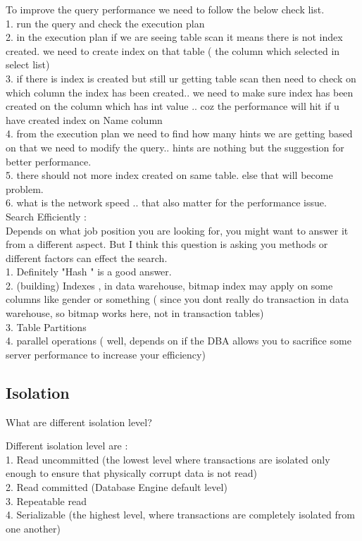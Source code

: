 To improve the query performance we need to follow the below check list. \\
1. run the query and check the execution plan \\
2. in the execution plan if we are seeing table scan it means there is not index created. we need to create index on that table ( the column which selected in select list) \\
3. if there is index is created but still ur getting table scan then need to check on which column the index has been created.. we need to make sure index has been created on the 
column which has int value .. coz the performance will hit if u have created index on Name column \\
4. from the execution plan we need to find how many hints we are getting based on that we need to modify the query.. hints are nothing but the suggestion for better performance. \\
5. there should not more index created on same table. else that will become problem. \\
6. what is the network speed .. that also matter for the performance issue. \\

Search Efficiently : \\
Depends on what job position you are looking for, you might want to answer it from a different aspect. But I think this question is asking you methods or different factors can 
effect the search. \\
1. Definitely "Hash " is a good answer. \\
2. (building) Indexes , in data warehouse, bitmap index may apply on some columns like gender or something ( since you dont really do transaction in data warehouse, so bitmap 
works here, not in transaction tables) \\
3. Table Partitions \\
4. parallel operations ( well, depends on if the DBA allows you to sacrifice some server performance to increase your efficiency)

\subsection{Isolation}
What are different isolation level?

Different isolation level are : \\
1. Read uncommitted (the lowest level where transactions are isolated only enough to ensure that physically corrupt data is not read) \\
2. Read committed (Database Engine default level) \\
3. Repeatable read \\
4. Serializable (the highest level, where transactions are completely isolated from one another)

